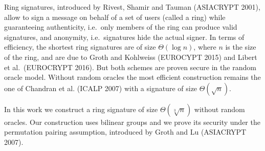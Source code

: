 Ring signatures, introduced by Rivest, Shamir and Tauman (ASIACRYPT 2001), allow to sign a message on behalf of a set of users (called a ring) while guaranteeing authenticity, i.e.~only members of the ring can produce valid signatures, and anonymity, i.e.~signatures hide the actual signer. In terms of efficiency, the shortest ring signatures are of size $\Theta(\log n)$, where $n$ is the size of the ring, and are due to Groth and Kohlweiss (EUROCYPT 2015) and Libert et al.~(EUROCRYPT 2016). But both schemes are proven secure in the random oracle model. Without random oracles the most efficient construction remains the one of Chandran et al. (ICALP 2007) with a signature of size $\Theta(\sqrt{n})$.

In this work we construct a ring signature of size $\Theta(\sqrt[3]{n})$ without random oracles. Our construction uses bilinear groups and we prove its security under the permutation pairing assumption, introduced by Groth and Lu (ASIACRYPT 2007).
